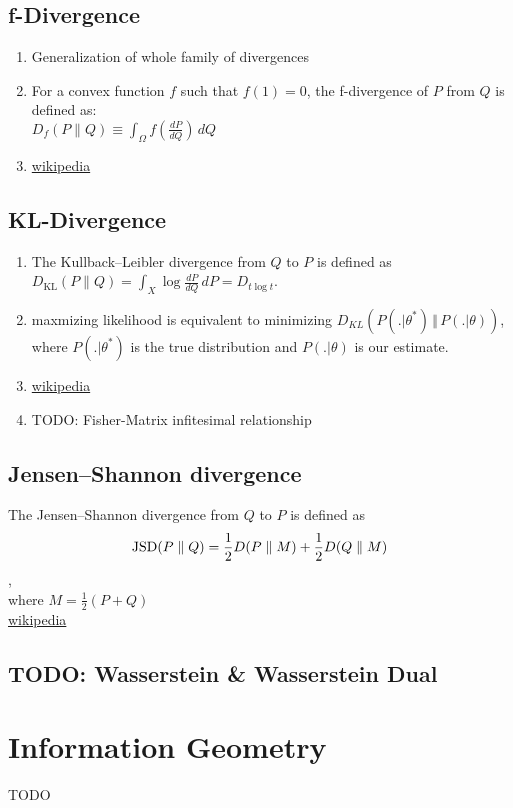 \subsection{f-Divergence}
\begin{enumerate}
	\item Generalization of whole family of divergences
	\item For a convex function $f$ such that $f(1) = 0$, the f-divergence of $P$ from $Q$ is defined as:\\
	$D_{f}(P\parallel Q)\equiv \int _{{\Omega }}f\left({\frac{dP}{dQ}}\right)\,dQ$
	\item \href{https://en.wikipedia.org/wiki/Divergence_(statistics)}{wikipedia}
\end{enumerate}

\subsection{KL-Divergence}
\begin{enumerate}
	\item The Kullback–Leibler divergence from $Q$ to $P$ is defined as\\
	$D_{\mathrm {KL} }(P\|Q)=\int _{X}\log {\frac {dP}{dQ}}\,dP=D_{t\log t}$.
	\item maxmizing likelihood is equivalent to minimizing $D_{KL}(P(. \vert \theta^{\ast}) \, \Vert \, P(. \vert \theta))$, where $P(. \vert \theta^{\ast})$ is the true distribution and $P(. \vert \theta)$ is our estimate.
	\item \href{https://en.wikipedia.org/wiki/Kullback–Leibler_divergence}{wikipedia}
	\item TODO: Fisher-Matrix infitesimal relationship
\end{enumerate}

\subsection{Jensen–Shannon divergence}
The Jensen–Shannon divergence from $Q$ to $P$ is defined as
\begin{align*}
	{{\rm {JSD}}}(P\parallel Q)={\frac  {1}{2}}D(P\parallel M)+{\frac  {1}{2}}D(Q\parallel M)
\end{align*},\\
 where $M={\frac  {1}{2}}(P+Q)$\\
\href{https://en.wikipedia.org/wiki/Jensen–Shannon_divergence}{wikipedia}

\subsection{TODO: Wasserstein \& Wasserstein Dual}

\section{Information Geometry}
TODO